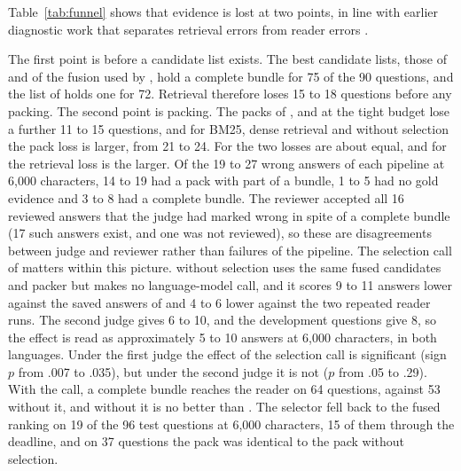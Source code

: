 Table~\ref{tab:funnel} shows that evidence is lost at two points, in line with earlier diagnostic work that separates retrieval errors from reader errors \citep{ru2024ragchecker,joren2025sufficient}.

The first point is before a candidate list exists. The best candidate lists, those of \hr{} and of the fusion used by \lexb{}, hold a complete bundle for 75 of the 90 questions, and the list of \hybrid{} holds one for 72. Retrieval therefore loses 15 to 18 questions before any packing. The second point is packing. The packs of \hybrid{}, \hr{} and \lexb{} at the tight budget lose a further 11 to 15 questions, and for BM25, dense retrieval and \lexb{} without selection the pack loss is larger, from 21 to 24. For \hybrid{} the two losses are about equal, and for \hr{} the retrieval loss is the larger. %
Of the 19 to 27 wrong answers of each pipeline at 6,000 characters, 14 to 19 had a pack with part of a bundle, 1 to 5 had no gold evidence and 3 to 8 had a complete bundle. The reviewer accepted all 16 reviewed answers that the judge had marked wrong in spite of a complete bundle (17 such answers exist, and one was not reviewed), so these are disagreements between judge and reviewer rather than failures of the pipeline.
The selection call of \lexb{} matters within this picture. \lexb{} without selection uses the same fused candidates and packer but makes no language-model call, and it scores 9 to 11 answers lower against the saved answers of \lexb{} and 4 to 6 lower against the two repeated reader runs. The second judge gives 6 to 10, and the development questions give 8, so the effect is read as approximately 5 to 10 answers at 6,000 characters, in both languages. Under the first judge the effect of the selection call is significant (sign $p$ from .007 to .035), but under the second judge it is not ($p$ from .05 to .29). With the call, a complete bundle reaches the reader on 64 questions, against 53 without it, and without it \lexb{} is no better than \hybrid{}. %
The selector fell back to the fused ranking on 19 of the 96 test questions at 6,000 characters, 15 of them through the deadline, and on 37 questions the pack was identical to the pack without selection. %
